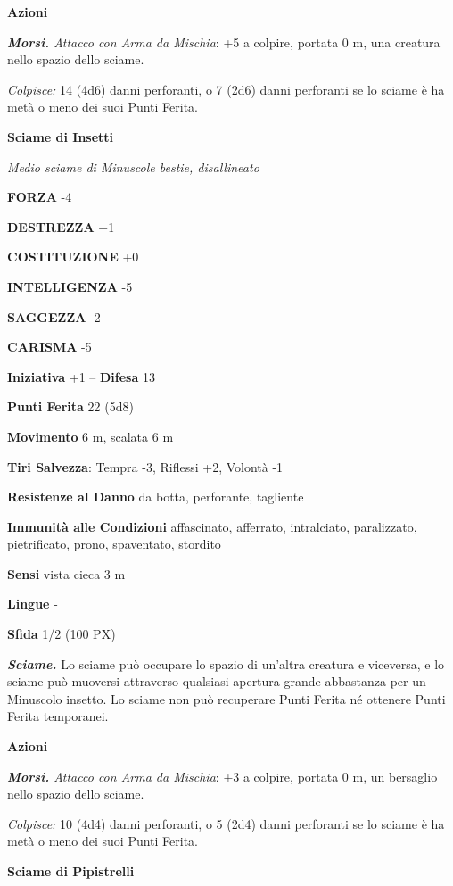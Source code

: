 \begin{multicols}{2}
	\textbf{Azioni}

	\textit{\textbf{Morsi.} Attacco con Arma da Mischia}: +5 a colpire, portata 0 m, una creatura nello spazio dello sciame.

	\textit{Colpisce:} 14 (4d6) danni perforanti, o 7 (2d6) danni perforanti se lo sciame è ha metà o meno dei suoi Punti Ferita.

	\medskip\textbf{Sciame di Insetti}

	\textit{Medio sciame di Minuscole bestie, disallineato}

	\textbf{FORZA} -4

	\textbf{DESTREZZA} +1

	\textbf{COSTITUZIONE} +0

	\textbf{INTELLIGENZA} -5

	\textbf{SAGGEZZA} -2

	\textbf{CARISMA} -5

	\textbf{Iniziativa} +1 -- \textbf{Difesa} 13

	\textbf{Punti Ferita} 22 (5d8)

	\textbf{Movimento} 6 m, scalata 6 m

	\textbf{Tiri Salvezza}: Tempra -3, Riflessi +2, Volontà -1

	\textbf{Resistenze al Danno} da botta, perforante, tagliente

	\textbf{Immunità alle Condizioni} affascinato, afferrato, intralciato, paralizzato, pietrificato, prono, spaventato, stordito

	\textbf{Sensi} vista cieca 3 m

	\textbf{Lingue} -

	\textbf{Sfida} 1/2 (100 PX)

	\textit{\textbf{Sciame.}} Lo sciame può occupare lo spazio di un'altra creatura e viceversa, e lo sciame può muoversi attraverso qualsiasi apertura grande abbastanza per un Minuscolo insetto. Lo sciame non può recuperare Punti Ferita né ottenere Punti Ferita temporanei.

	\textbf{Azioni}

	\textit{\textbf{Morsi.} Attacco con Arma da Mischia}: +3 a colpire, portata 0 m, un bersaglio nello spazio dello sciame.

	\textit{Colpisce:} 10 (4d4) danni perforanti, o 5 (2d4) danni perforanti se lo sciame è ha metà o meno dei suoi Punti Ferita.

	\medskip\textbf{Sciame di Pipistrelli}


\end{multicols}
